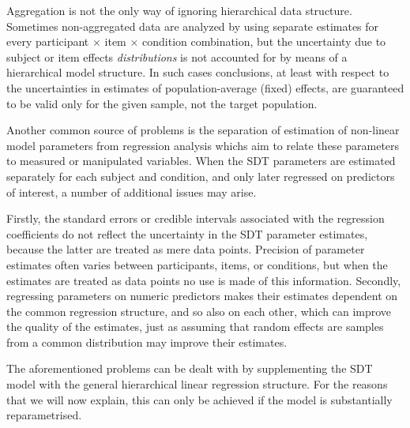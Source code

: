 \documentclass[oneside,a4paper]{article}
\begin{document}
Aggregation is not the only way of ignoring hierarchical data
structure. Sometimes non-aggregated data are analyzed by using
separate estimates for every participant $\times$ item $\times$
condition combination, but the uncertainty due to subject or item
effects \emph{distributions} is not accounted for by means of a
hierarchical model
structure. In such cases conclusions, at least with respect to
%
the uncertainties in estimates of population-average (fixed)
effects, are guaranteed to be valid only for the given sample, not the
target population.

Another common source of problems is the separation of estimation of
non-linear model parameters from regression analysis whichs aim to
relate these parameters to measured or manipulated variables. When the
SDT parameters are estimated separately for each subject and
condition, and only later regressed on predictors of interest, a
number of additional issues may arise.

Firstly, the standard errors or credible intervals associated with the
regression coefficients do not reflect the uncertainty in the SDT
parameter estimates, because the latter are treated as mere data
points. Precision of parameter estimates often varies between
participants, items, or conditions, but when the estimates are treated
as data points no use is made of this information. Secondly,
regressing parameters on numeric predictors makes their estimates
dependent on the common regression structure, and so also on each
other, which can improve the quality of the estimates, just as
assuming that random effects are samples from a common distribution
may improve their estimates.

The aforementioned problems can be dealt with by supplementing the SDT
model with the general hierarchical linear regression structure. For
the reasons that we will now explain, this can only be achieved if the
model is substantially reparametrised.
\end{document}
